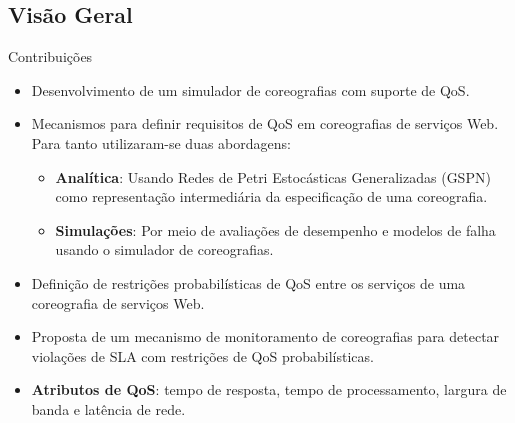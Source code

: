\documentclass[xcolor=svgnames]{beamer}
\begin{document}
\subsection{Visão Geral}
   \begin{frame}{Contribuições}

      \begin{itemize}
	  \item <1->  Desenvolvimento de um simulador de coreografias com suporte de QoS.
          \item <2-> Mecanismos para definir requisitos de QoS em coreografias de serviços Web. Para tanto utilizaram-se duas abordagens:
             \begin{itemize}
                  \item \textbf{Analítica}:  Usando Redes de Petri Estocásticas Generalizadas (GSPN) como representação intermediária
		    da especificação de uma coreografia.
                  \item \textbf{Simulações}: Por meio de avaliações de desempenho e modelos de falha usando o simulador de coreografias.
            \end{itemize}

         \item <3-> Definição de restrições  probabilísticas de QoS entre os serviços de uma  coreografia de serviços Web.
	 \item <4-> Proposta de um mecanismo de monitoramento de coreografias para detectar violações de SLA com restrições de QoS probabilísticas.
	 \item <5->\textbf{Atributos de QoS}: tempo de resposta, tempo de processamento, largura de banda e latência de rede.
       \end{itemize}


   \end{frame}
\end{document}
